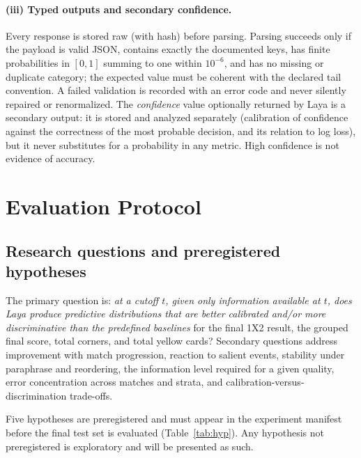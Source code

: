 \documentclass[11pt]{article}
\begin{document}
\paragraph{(iii) Typed outputs and secondary confidence.}
Every response is stored raw (with hash) before parsing. Parsing succeeds only
if the payload is valid JSON, contains exactly the documented keys, has finite
probabilities in $[0,1]$ summing to one within $10^{-6}$, and has no missing
or duplicate category; the expected value must be coherent with the declared
tail convention. A failed validation is recorded with an error code and never
silently repaired or renormalized. The \emph{confidence} value optionally
returned by Laya is a secondary output: it is stored and analyzed separately
(calibration of confidence against the correctness of the most probable
decision, and its relation to log loss), but it never substitutes for a
probability in any metric. High confidence is not evidence of accuracy.

\section{Evaluation Protocol}
\label{sec:protocol}

\subsection{Research questions and preregistered hypotheses}
\label{sec:hyp}

The primary question is: \emph{at a cutoff $t$, given only information
available at $t$, does Laya produce predictive distributions that are better
calibrated and/or more discriminative than the predefined baselines} for the
final 1X2 result, the grouped final score, total corners, and total yellow
cards? Secondary questions address improvement with match progression,
reaction to salient events, stability under paraphrase and reordering, the
information level required for a given quality, error concentration across
matches and strata, and calibration-versus-discrimination trade-offs.

Five hypotheses are preregistered and must appear in the experiment manifest
before the final test set is evaluated (Table~\ref{tab:hyp}). Any hypothesis
not preregistered is exploratory and will be presented as such.
\end{document}

